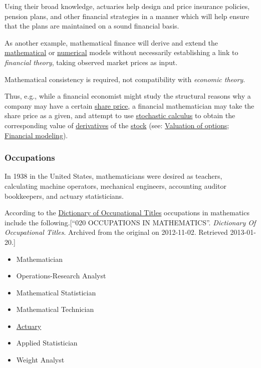 \documentclass{article}
\begin{document}
Using their broad knowledge, actuaries help design and price insurance policies, pension plans, and other financial strategies in a manner which will help ensure that the plans are maintained on a sound financial basis.

%
As another example, mathematical finance will derive and extend the \href{https://en.wikipedia.org/wiki/Mathematical_model}{mathematical} or \href{https://en.wikipedia.org/wiki/Numerical_analysis}{numerical} models without necessarily establishing a link to \textit{financial theory}, taking observed market prices as input.

Mathematical consistency is required, not compatibility with \textit{economic theory}.

Thus, e.g., while a financial economist might study the structural reasons why a company may have a certain \href{https://en.wikipedia.org/wiki/Share_price}{share price}, a financial mathematician may take the share price as a given, and attempt to use \href{https://en.wikipedia.org/wiki/Stochastic_calculus}{stochastic calculus} to obtain the corresponding value of \href{https://en.wikipedia.org/wiki/Derivative_(finance)}{derivatives} of the \href{https://en.wikipedia.org/wiki/Stock}{stock} (see: \href{https://en.wikipedia.org/wiki/Valuation_of_options}{Valuation of options}; \href{https://en.wikipedia.org/wiki/Financial_modeling#Quantitative_finance}{Financial modeling}).

\subsubsection{Occupations}
\textsf{In 1938 in the United States, mathematicians were desired as teachers, calculating machine operators, mechanical engineers, accounting auditor bookkeepers, and actuary statisticians.}

According to the \href{https://en.wikipedia.org/wiki/Dictionary_of_Occupational_Titles}{Dictionary of Occupational Titles} occupations in mathematics include the following.[``020 OCCUPATIONS IN MATHEMATICS''. \textit{Dictionary Of Occupational Titles}. Archived from the original on 2012-11-02. Retrieved 2013-01-20.]
\begin{itemize}
	\item Mathematician
	\item Operations-Research Analyst
	\item Mathematical Statistician
	\item Mathematical Technician
	\item \href{https://en.wikipedia.org/wiki/Actuary}{Actuary}
	\item Applied Statistician
	\item Weight Analyst
\end{itemize}
\end{document}
